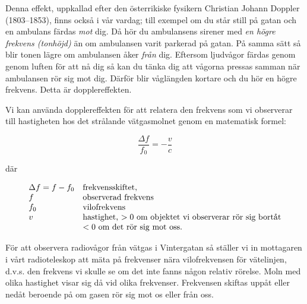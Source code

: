 Denna effekt, uppkallad efter den österrikiske fysikern Christian Johann Doppler
(1803--1853), finns också i vår vardag; till exempel om du står still på gatan 
och en ambulans färdas {\em mot } dig. Då hör du ambulansens sirener med {\em en högre
frekvens (tonhöjd)} än om ambulansen varit parkerad på gatan. På samma sätt
så blir tonen lägre om ambulansen åker {\em från } dig. Eftersom
ljudvågor färdas genom genom luften för att nå dig så kan du tänka dig att
vågorna pressas samman när ambulansen rör sig mot dig. Därför blir våglängden
kortare och du hör en högre frekvens. Detta är dopplereffekten. 

Vi kan använda dopplereffekten för att relatera den frekvens som vi observerar till
hastigheten hos det strålande vätgasmolnet genom en matematisk formel:

\begin{equation}
{\boxed{
\frac{\Delta f}{f_0}=-\frac{v}{c}
}}
\end{equation}

där

\begin{displaymath}
\begin{array}{ll}
  \Delta f=f-f_0    &\hbox{frekvensskiftet}, 	\\
  f		    &\hbox{observerad frekvens} 	\\
  f_0		    &\hbox{vilofrekvens}	\\
  v		    &\hbox{hastighet, $> 0$ om objektet vi observerar
    rör sig bortåt}	\\
                    &\hbox{$< 0$ om det rör sig mot oss.}
\end{array}
\end{displaymath}

För att observera radiovågor från vätgas i Vintergatan så ställer vi in 
mottagaren i vårt radioteleskop att mäta på frekvenser nära vilofrekvensen 
för vätelinjen, d.v.s. den frekvens vi skulle se om det inte fanns någon relativ
rörelse. Moln med olika hastighet visar sig då vid olika frekvenser. Frekvensen
skiftas uppåt eller nedåt beroende på om gasen rör sig mot os eller från oss. 
